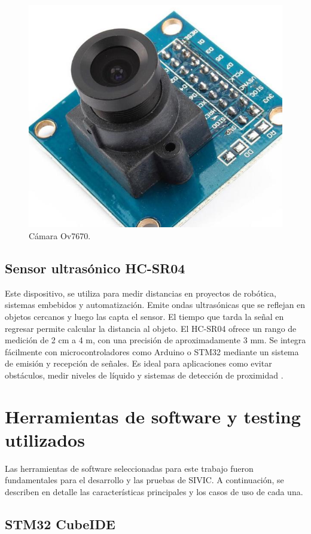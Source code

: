 \begin{figure}[htbp]
	\centering
	\includegraphics[width=.5\textwidth]{./Figures/camara.png}
	\caption{Cámara Ov7670\protect\footnotemark.}
	\label{fig:camara2024}
\end{figure}


\subsection{Sensor ultrasónico HC-SR04}
\label{subsec:hcsr04}

Este dispositivo, se utiliza para medir distancias en proyectos de robótica, sistemas embebidos y automatización. Emite ondas ultrasónicas que se reflejan en objetos cercanos y luego las capta el sensor. El tiempo que tarda la señal en regresar permite calcular la distancia al objeto. El HC-SR04 ofrece un rango de medición de 2 cm a 4 m, con una precisión de aproximadamente 3 mm. Se integra fácilmente con microcontroladores como Arduino o STM32 mediante un sistema de emisión y recepción de señales. Es ideal para aplicaciones como evitar obstáculos, medir niveles de líquido y sistemas de detección de proximidad \citep{WEBSITE:hcsr2024}.

\section{Herramientas de software y testing utilizados}

Las herramientas de software seleccionadas para este trabajo fueron fundamentales para el desarrollo y las pruebas de SIVIC. A continuación, se describen en detalle las características principales y los casos de uso de cada una.

\subsection{STM32 CubeIDE}
\label{subsec:stm32}

